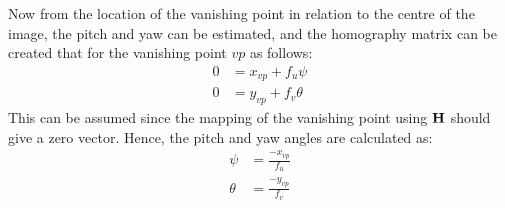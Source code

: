 Now from the location of the vanishing point in relation to the centre of the image, the pitch and yaw can be estimated, and the homography matrix can be created that for the vanishing point $vp$ as follows:
\begin{align}
    0 &= x_{vp} + f_u \psi\\
    0 &= y_{vp} + f_v \theta
\end{align}
This can be assumed since the mapping of the vanishing point using $\bf{H}$ should give a zero vector. Hence, the pitch and yaw angles are calculated as:
\begin{align}
    \psi &= \frac{-x_{vp}}{f_u}\\
    \theta &= \frac{-y_{vp}}{f_v}
\end{align}